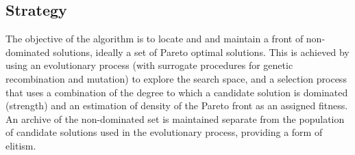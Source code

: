 \subsection{Strategy}
The objective of the algorithm is to locate and and maintain a front of non-dominated solutions, ideally a set of Pareto optimal solutions.
This is achieved by using an evolutionary process (with surrogate procedures for genetic recombination and mutation) to explore the search space, and a selection process that uses a combination of the degree to which a candidate solution is dominated (strength) and an estimation of density of the Pareto front as an assigned fitness. An archive of the non-dominated set is maintained separate from the population of candidate solutions used in the evolutionary process, providing a form of elitism.

